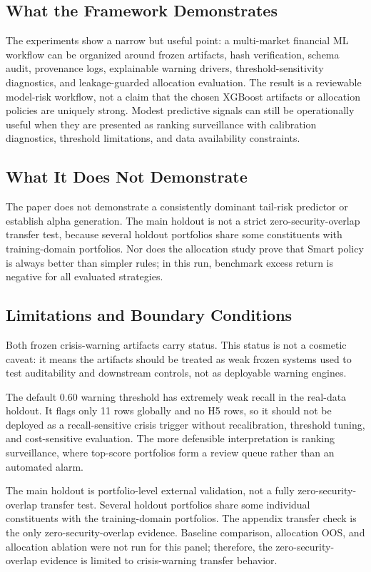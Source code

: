 \documentclass{ieeeaccess}
\begin{document}
\subsection{What the Framework Demonstrates}
The experiments show a narrow but useful point: a multi-market financial ML workflow can be organized around frozen artifacts, hash verification, schema audit, provenance logs, explainable warning drivers, threshold-sensitivity diagnostics, and leakage-guarded allocation evaluation. The result is a reviewable model-risk workflow, not a claim that the chosen XGBoost artifacts or allocation policies are uniquely strong. Modest predictive signals can still be operationally useful when they are presented as ranking surveillance with calibration diagnostics, threshold limitations, and data availability constraints.

\subsection{What It Does Not Demonstrate}
The paper does not demonstrate a consistently dominant tail-risk predictor or establish alpha generation. The main holdout is not a strict zero-security-overlap transfer test, because several holdout portfolios share some constituents with training-domain portfolios. Nor does the allocation study prove that Smart policy is always better than simpler rules; in this run, benchmark excess return is negative for all evaluated strategies.

\subsection{Limitations and Boundary Conditions}
Both frozen crisis-warning artifacts carry  status. This status is not a cosmetic caveat: it means the artifacts should be treated as weak frozen systems used to test auditability and downstream controls, not as deployable warning engines.

The default 0.60 warning threshold has extremely weak recall in the real-data holdout. It flags only 11 rows globally and no H5 rows, so it should not be deployed as a recall-sensitive crisis trigger without recalibration, threshold tuning, and cost-sensitive evaluation. The more defensible interpretation is ranking surveillance, where top-score portfolios form a review queue rather than an automated alarm.

The main holdout is portfolio-level external validation, not a fully zero-security-overlap transfer test. Several holdout portfolios share some individual constituents with the training-domain portfolios. The appendix transfer check is the only zero-security-overlap evidence. Baseline comparison, allocation OOS, and allocation ablation were not run for this panel; therefore, the zero-security-overlap evidence is limited to crisis-warning transfer behavior.
\end{document}
